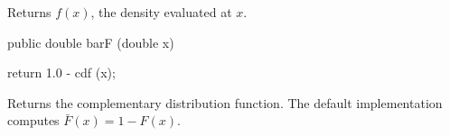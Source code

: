 \begin{tabb} Returns $f(x)$, the density evaluated at $x$.
\end{tabb}
\begin{htmlonly}
\end{htmlonly}
%
\begin{code}

   public double barF (double x)\begin{hide} {
      return 1.0 - cdf (x);
   }\end{hide}
\end{code}
 \begin{tabb} Returns the complementary distribution function.
    The default implementation computes $\bar F(x) = 1 - F(x)$.
 \end{tabb}
\begin{htmlonly}
\end{htmlonly}
